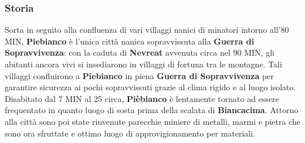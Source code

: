 \documentclass[10pt,twoside,onecolumn,openany]{book}
\begin{document}
\subsubsection{Storia}
Sorta in seguito alla confluenza di vari villaggi nanici di minatori intorno all'80 MIN, \textbf{Piebianco} è l'unica città nanica sopravvissuta alla \textbf{Guerra di Sopravvivenza}: con la caduta di \textbf{Nevreat} avvenuta circa nel 90 MIN, gli abitanti ancora vivi si insediarono in villaggi di fortuna tra le montagne. Tali villaggi confluirono a \textbf{Piebianco} in piena \textbf{Guerra di Sopravvivenza} per garantire sicurezza ai pochi sopravvissuti grazie al clima rigido e al luogo isolato.\\
Disabitato dal 7 MIN al 25 circa, \textbf{Pièbianco} è lentamente tornato ad essere frequentato in quanto luogo di sosta prima della scalata di \textbf{Biancacima}. Attorno alla città sono poi state rinvenute parecchie miniere di metalli, marmi e pietra che sono ora sfruttate e ottimo luogo di approvigionamento per materiali.
\newpage
\end{document}

